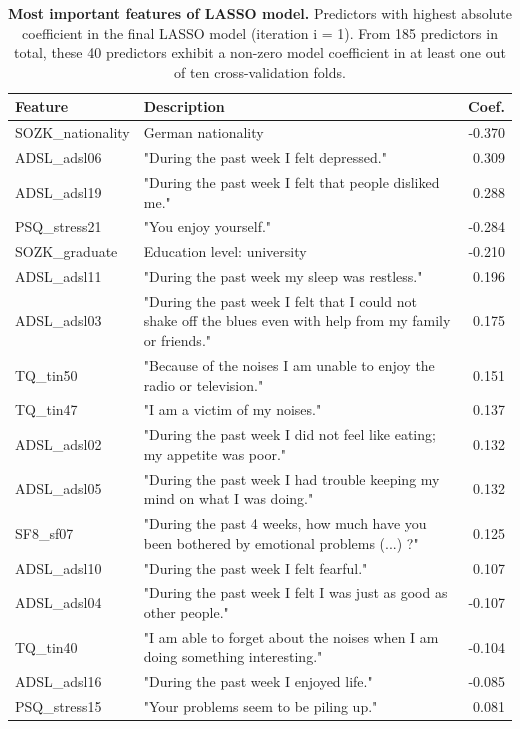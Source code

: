 \documentclass[
  oneside]{book}
\begin{document}
\begin{longtable}[t]{l>{\raggedright\arraybackslash}p{10cm}r}
\caption{\label{tab:09-lasso-depression-tab}\textbf{Most important features of LASSO model.} Predictors with highest absolute coefficient in the final LASSO model (iteration i = 1). From 185 predictors in total, these 40 predictors exhibit a non-zero model coefficient in at least one out of ten cross-validation folds.}\\
\toprule
\textbf{Feature} & \textbf{Description} & \textbf{Coef.}\\
\midrule
SOZK\_nationality & German nationality & -0.370\\
ADSL\_adsl06 & "During the past week I felt depressed." & 0.309\\
ADSL\_adsl19 & "During the past week I felt that people disliked me." & 0.288\\
PSQ\_stress21 & "You enjoy yourself." & -0.284\\
SOZK\_graduate & Education level: university & -0.210\\
ADSL\_adsl11 & "During the past week my sleep was restless." & 0.196\\
ADSL\_adsl03 & "During the past week I felt that I could not shake off the blues even with help from my family or friends." & 0.175\\
TQ\_tin50 & "Because of the noises I am unable to enjoy the radio or television." & 0.151\\
TQ\_tin47 & "I am a victim of my noises." & 0.137\\
ADSL\_adsl02 & "During the past week I did not feel like eating; my appetite was poor." & 0.132\\
ADSL\_adsl05 & "During the past week I had trouble keeping my mind on what I was doing." & 0.132\\
SF8\_sf07 & "During the past 4 weeks, how much have you been bothered by emotional problems (...) ?" & 0.125\\
ADSL\_adsl10 & "During the past week I felt fearful." & 0.107\\
ADSL\_adsl04 & "During the past week I felt I was just as good as other people." & -0.107\\
TQ\_tin40 & "I am able to forget about the noises when I am doing something interesting." & -0.104\\
ADSL\_adsl16 & "During the past week I enjoyed life." & -0.085\\
PSQ\_stress15 & "Your problems seem to be piling up." & 0.081\\

\end{longtable}
\end{document}
